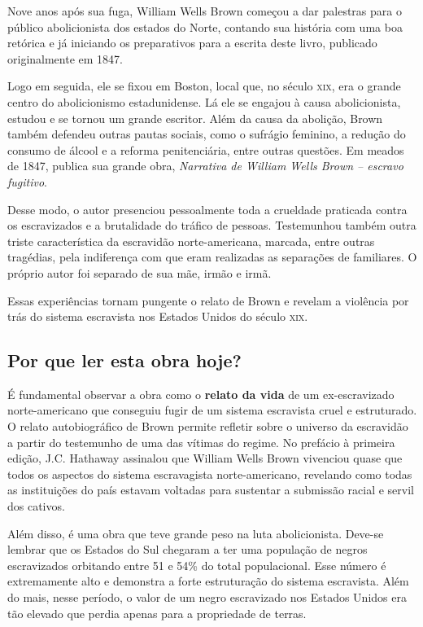\documentclass[11pt]{extarticle}
\begin{document}
\begin{enumerate}
Nove anos após sua fuga, William Wells Brown começou a dar palestras
para o público abolicionista dos estados do Norte, contando sua história
com uma boa retórica e já iniciando os preparativos para a escrita deste
livro, publicado originalmente em 1847.

Logo em seguida, ele se fixou em Boston, local que, no século \textsc{xix}, era o
grande centro do abolicionismo estadunidense. Lá ele se engajou à causa
abolicionista, estudou e se tornou um grande escritor. Além da causa da
abolição, Brown também defendeu outras pautas sociais, como o sufrágio
feminino, a redução do consumo de álcool e a reforma penitenciária,
entre outras questões. Em meados de 1847, publica sua grande obra,
\emph{Narrativa de William Wells Brown -- escravo fugitivo}.

Desse modo, o autor presenciou pessoalmente toda a crueldade praticada
contra os escravizados e a brutalidade do tráfico de pessoas.
Testemunhou também outra triste característica da escravidão
norte-americana, marcada, entre outras tragédias, pela indiferença com
que eram realizadas as separações de familiares. O próprio autor foi
separado de sua mãe, irmão e irmã.

Essas experiências tornam pungente o relato de Brown e revelam a
violência por trás do sistema escravista nos Estados Unidos do século
\textsc{xix}.

\subsection{Por que ler esta obra hoje?}

É fundamental observar a obra como o \textbf{relato da vida} de um
ex-escravizado norte-americano que conseguiu fugir de um sistema
escravista cruel e estruturado. O relato autobiográfico de Brown permite
refletir sobre o universo da escravidão a partir do testemunho de uma
das vítimas do regime. No prefácio à primeira edição, J.C. Hathaway
assinalou que William Wells Brown vivenciou quase que todos os aspectos
do sistema escravagista norte-americano, revelando como todas as
instituições do país estavam voltadas para sustentar a submissão racial
e servil dos cativos.

Além disso, é uma obra que teve grande peso na luta abolicionista.
Deve-se lembrar que os Estados do Sul chegaram a ter uma população de
negros escravizados orbitando entre 51 e 54\% do total populacional.
Esse número é extremamente alto e demonstra a forte estruturação do
sistema escravista. Além do mais, nesse período, o valor de um negro
escravizado nos Estados Unidos era tão elevado que perdia apenas para a
propriedade de terras.


\end{enumerate}
\end{document}
